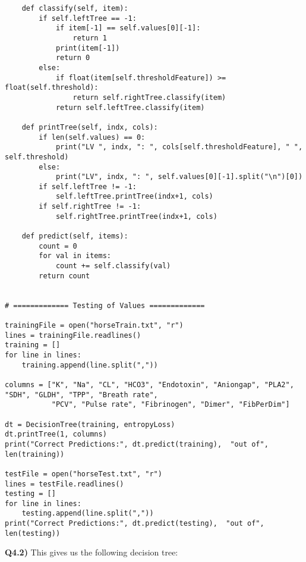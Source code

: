 \documentclass{article}
\begin{document}
\begin{titlepage}
\begin{lstlisting}
    def classify(self, item):
        if self.leftTree == -1:
            if item[-1] == self.values[0][-1]:
                return 1
            print(item[-1])
            return 0
        else:
            if float(item[self.thresholdFeature]) >= float(self.threshold):
                return self.rightTree.classify(item)
            return self.leftTree.classify(item)

    def printTree(self, indx, cols):
        if len(self.values) == 0:
            print("LV ", indx, ": ", cols[self.thresholdFeature], " ", self.threshold)
        else:
            print("LV", indx, ": ", self.values[0][-1].split("\n")[0])
        if self.leftTree != -1:
            self.leftTree.printTree(indx+1, cols)
        if self.rightTree != -1:
            self.rightTree.printTree(indx+1, cols)

    def predict(self, items):
        count = 0
        for val in items:
            count += self.classify(val)
        return count


# ============= Testing of Values =============

trainingFile = open("horseTrain.txt", "r")
lines = trainingFile.readlines()
training = []
for line in lines:
    training.append(line.split(","))

columns = ["K", "Na", "CL", "HCO3", "Endotoxin", "Aniongap", "PLA2", "SDH", "GLDH", "TPP", "Breath rate",
           "PCV", "Pulse rate", "Fibrinogen", "Dimer", "FibPerDim"]

dt = DecisionTree(training, entropyLoss)
dt.printTree(1, columns)
print("Correct Predictions:", dt.predict(training),  "out of", len(training))

testFile = open("horseTest.txt", "r")
lines = testFile.readlines()
testing = []
for line in lines:
    testing.append(line.split(","))
print("Correct Predictions:", dt.predict(testing),  "out of", len(testing))
\end{lstlisting}
\textbf{Q4.2)} This gives us the following decision tree:\\\\

\end{titlepage}
\end{document}
